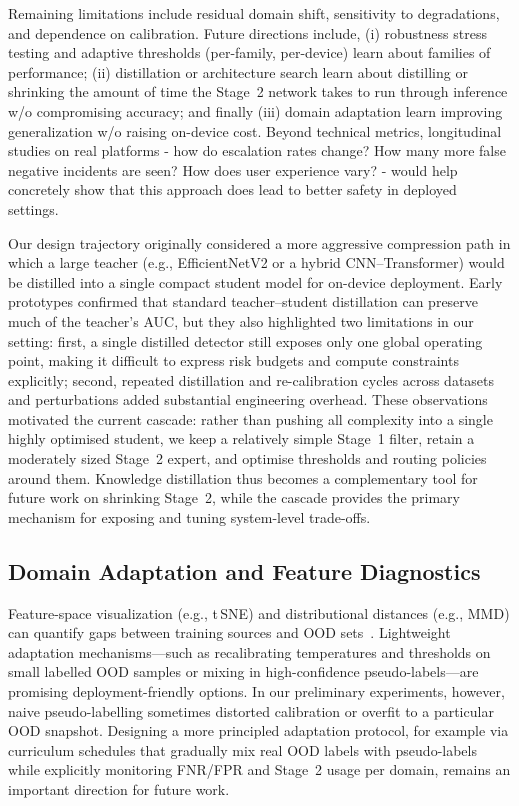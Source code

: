 Remaining limitations include residual domain shift, sensitivity to degradations, and dependence on calibration. Future directions include, (i) robustness stress testing and adaptive thresholds (per\hyp family, per\hyp device) learn about families of performance; (ii) distillation or architecture search learn about distilling or shrinking the amount of time the Stage~2 network takes to run through inference w/o compromising accuracy; and finally (iii) domain adaptation learn improving generalization w/o raising on\hyp device cost. Beyond technical metrics, longitudinal studies on real platforms - how do escalation rates change? How many more false negative incidents are seen? How does user experience vary? - would help concretely show that this approach does lead to better safety in deployed settings.

Our design trajectory originally considered a more aggressive compression path in which a large teacher (e.g., EfficientNetV2 or a hybrid CNN--Transformer) would be distilled into a single compact student model for on\hyp device deployment. Early prototypes confirmed that standard teacher--student distillation can preserve much of the teacher's AUC, but they also highlighted two limitations in our setting: first, a single distilled detector still exposes only one global operating point, making it difficult to express risk budgets and compute constraints explicitly; second, repeated distillation and re\hyp calibration cycles across datasets and perturbations added substantial engineering overhead. These observations motivated the current cascade: rather than pushing all complexity into a single highly optimised student, we keep a relatively simple Stage~1 filter, retain a moderately sized Stage~2 expert, and optimise thresholds and routing policies around them. Knowledge distillation thus becomes a complementary tool for future work on shrinking Stage~2, while the cascade provides the primary mechanism for exposing and tuning system\hyp level trade\hyp offs.

\subsection*{Domain Adaptation and Feature Diagnostics}
Feature\hyp space visualization (e.g., t\,\-SNE) and distributional distances (e.g., MMD) can quantify gaps between training sources and OOD sets~\cite{wang2018deepDA_survey}. Lightweight adaptation mechanisms---such as recalibrating temperatures and thresholds on small labelled OOD samples or mixing in high\hyp confidence pseudo\hyp labels---are promising deployment\hyp friendly options. In our preliminary experiments, however, naive pseudo\hyp labelling sometimes distorted calibration or overfit to a particular OOD snapshot. Designing a more principled adaptation protocol, for example via curriculum schedules that gradually mix real OOD labels with pseudo\hyp labels while explicitly monitoring FNR/FPR and Stage~2 usage per domain, remains an important direction for future work.

